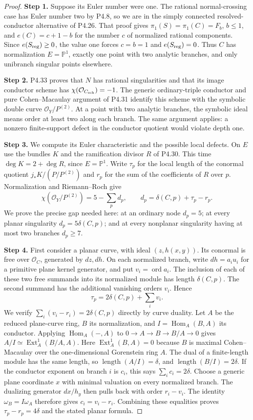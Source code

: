 \begin{proof}
\noindent\textbf{Step 1.} Suppose its Euler number were one. The rational
normal-crossing case has Euler number two by P4.8, so we
are in the simply connected resolved-conductor alternative
of P4.26. That proof gives $\pi_1(S)=\pi_1(C)=F_b$,
$b\le1$, and
$e(C)=c+1-b$ for the number $c$ of normalized rational
components. Since $e(S_{\rm reg})\ge0$, the value one
forces $c=b=1$ and $e(S_{\rm reg})=0$.
Thus $C$ has normalization $E=\mathbb P^1$, exactly one
point with two analytic branches, and only unibranch
singular points elsewhere.

\noindent\textbf{Step 2.} P4.33 proves that $N$ has rational singularities and
that its image conductor scheme has
$\chi(\mathcal O_{C_{\rm sch}})=-1$.
The generic ordinary-triple conductor and pure
Cohen--Macaulay argument of P4.31 identify this scheme
with the symbolic double curve $\mathcal O_Y/P^{(2)}$.
At a point with two analytic branches, the symbolic ideal
means order at least two along each branch. The same
argument applies: a nonzero finite-support defect in the
conductor quotient would violate depth one.

\noindent\textbf{Step 3.} We compute its Euler characteristic and the possible
local defects. On $E$ use the bundles $K$ and the
ramification divisor $R$ of P4.30. This time
$\deg K=2+\deg R$, since $E=\mathbb P^1$.
Write $\tau_p$ for the local length of the conormal
quotient $j_*K/(P/P^{(2)})$ and $r_p$ for the sum of
the coefficients of $R$ over $p$. Normalization and
Riemann--Roch give
\[
 \chi(\mathcal O_Y/P^{(2)})
 =5-\sum_p d_p,
 \qquad d_p=\delta(C,p)+\tau_p-r_p.
\]
We prove the precise gap needed here: at an ordinary
node $d_p=5$; at every planar singularity
$d_p=5\delta(C,p)$; and at every nonplanar singularity
having at most two branches $d_p\ge7$.

\noindent\textbf{Step 4.} First consider a planar curve, with ideal $(z,h(x,y))$.
Its conormal is free over $\mathcal O_C$, generated by
$dz,dh$. On each normalized branch, write
$dh=a_i u_i$ for a primitive plane kernel generator,
and put $v_i=\operatorname{ord}a_i$.
The inclusion of each of these two free summands into
its normalized module has length $\delta(C,p)$.
The second summand has the additional vanishing orders
$v_i$. Hence
\[
 \tau_p=2\delta(C,p)+\sum_i v_i.
\]
We verify $\sum_i(v_i-r_i)=2\delta(C,p)$ directly by
curve duality. Let $A$ be the reduced plane-curve ring,
$B$ its normalization, and $I=\operatorname{Hom}_A(B,A)$
its conductor. Applying $\operatorname{Hom}_A(-,A)$ to
$0\to A\to B\to B/A\to0$ gives
$A/I\simeq\operatorname{Ext}^1_A(B/A,A)$.
Here $\operatorname{Ext}^1_A(B,A)=0$ because $B$ is
maximal Cohen--Macaulay over the one-dimensional
Gorenstein ring $A$. The dual of a finite-length module
has the same length, so $\operatorname{length}(A/I)=\delta$,
and $\operatorname{length}(B/I)=2\delta$.
If the conductor exponent on branch $i$ is $c_i$,
this says $\sum_i c_i=2\delta$.
Choose a generic plane coordinate $x$ with minimal
valuation on every normalized branch. The dualizing
generator $dx/h_y$ then pulls back with
order $r_i-v_i$. The identity
$\omega_B=I\omega_A$ therefore gives
$c_i=v_i-r_i$. Combining these equalities proves
$\tau_p-r_p=4\delta$ and the stated planar formula.


\end{proof}
